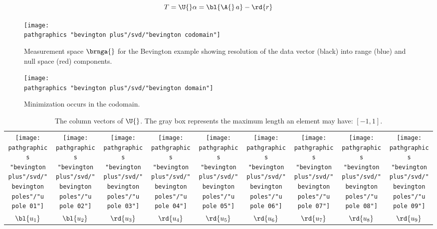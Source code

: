   \begin{equation*}
        T = \U{} \alpha = \bl{\A{}\,a} - \rd{r}
  \end{equation*}
\begin{figure}[t]
	\begin{center}
		\texttt{[image: \\pathgraphics "bevington plus"/svd/"bevington codomain"]}
	\end{center}
	\caption[Measurement space for the Bevington example]{Measurement space $\brnga{}$ for the Bevington example showing resolution of the data vector (black) into range (blue) and null space (red) components.}
	\label{fig:bevington codomain}
\end{figure}
%
\begin{figure}[t]
	\begin{center}
		\texttt{[image: \\pathgraphics "bevington plus"/svd/"bevington domain"]}
	\end{center}
	\caption{Minimization occurs in the codomain.}
	\label{fig:bevington codomain with data}
\end{figure}

\begin{table}[t]
	\begin{center}
		\begin{tabular}{ccccccccc}
			\texttt{[image: \\pathgraphics "bevington plus"/svd/"bevington poles"/"u pole 01"]} &
			\texttt{[image: \\pathgraphics "bevington plus"/svd/"bevington poles"/"u pole 02"]} &
			\texttt{[image: \\pathgraphics "bevington plus"/svd/"bevington poles"/"u pole 03"]} &
			\texttt{[image: \\pathgraphics "bevington plus"/svd/"bevington poles"/"u pole 04"]} &
			\texttt{[image: \\pathgraphics "bevington plus"/svd/"bevington poles"/"u pole 05"]} &
			\texttt{[image: \\pathgraphics "bevington plus"/svd/"bevington poles"/"u pole 06"]} &
			\texttt{[image: \\pathgraphics "bevington plus"/svd/"bevington poles"/"u pole 07"]} &
			\texttt{[image: \\pathgraphics "bevington plus"/svd/"bevington poles"/"u pole 08"]} &
			\texttt{[image: \\pathgraphics "bevington plus"/svd/"bevington poles"/"u pole 09"]} \\
		  $\bl{u_{1}}$ & $\bl{u_{2}}$ & $\rd{u_{3}}$ & $\rd{u_{4}}$ & $\rd{u_{5}}$ & $\rd{u_{6}}$ & $\rd{u_{7}}$ & $\rd{u_{8}}$ & $\rd{u_{9}}$
		\end{tabular}
	\end{center}
	\label{tab:bevington poles}
	\caption[The column vectors of $\U{}$.]{The column vectors of $\U{}$. The gray box represents the maximum length an element may have: $[-1,1]$.}
\end{table}%


